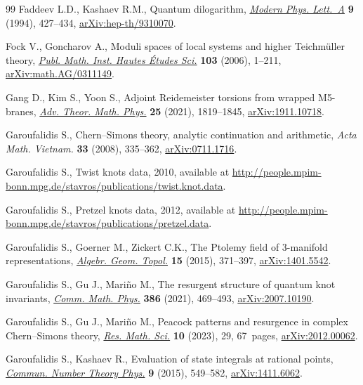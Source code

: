 \documentclass[pdftex]{sigma}
\numberwithin{equation}{section}
\begin{document}
\begin{thebibliography}{99}
Faddeev L.D., Kashaev R.M., Quantum dilogarithm, \href{https://doi.org/10.1142/S0217732394000447}{\textit{Modern Phys. Lett.~A}}
 \textbf{9} (1994), 427--434, \href{https://arxiv.org/abs/hep-th/9310070}{arXiv:hep-th/9310070}.

Fock V., Goncharov A., Moduli spaces of local systems and higher
 {T}eichm\"uller theory, \href{https://doi.org/10.1007/s10240-006-0039-4}{\textit{Publ. Math. Inst. Hautes \'Etudes Sci.}}
 \textbf{103} (2006), 1--211, \href{https://arxiv.org/abs/math.AG/0311149}{arXiv:math.AG/0311149}.

Gang D., Kim S., Yoon S., Adjoint {R}eidemeister torsions from wrapped
 {M}5-branes, \href{https://doi.org/10.4310/atmp.2021.v25.n7.a4}{\textit{Adv. Theor. Math. Phys.}} \textbf{25} (2021), 1819--1845,
 \href{https://arxiv.org/abs/1911.10718}{arXiv:1911.10718}.

Garoufalidis S., Chern--{S}imons theory, analytic continuation and arithmetic,
 \textit{Acta Math. Vietnam.} \textbf{33} (2008), 335--362,
 \href{https://arxiv.org/abs/0711.1716}{arXiv:0711.1716}.

Garoufalidis S., Twist knots data, 2010, available at
 \url{http://people.mpim-bonn.mpg.de/stavros/publications/twist.knot.data}.

Garoufalidis S., Pretzel knots data, 2012, available at
 \url{http://people.mpim-bonn.mpg.de/stavros/publications/pretzel.data}.

Garoufalidis S., Goerner M., Zickert C.K., The {P}tolemy field of 3-manifold
 representations, \href{https://doi.org/10.2140/agt.2015.15.371}{\textit{Algebr. Geom. Topol.}} \textbf{15} (2015), 371--397,
 \href{https://arxiv.org/abs/1401.5542}{arXiv:1401.5542}.

Garoufalidis S., Gu J., Mari\~no M., The resurgent structure of quantum knot
 invariants, \href{https://doi.org/10.1007/s00220-021-04076-0}{\textit{Comm. Math. Phys.}} \textbf{386} (2021), 469--493,
 \href{https://arxiv.org/abs/2007.10190}{arXiv:2007.10190}.

Garoufalidis S., Gu J., Mari\~no M., Peacock patterns and resurgence in complex
 {C}hern--{S}imons theory, \href{https://doi.org/10.1007/s40687-023-00391-1}{\textit{Res. Math. Sci.}} \textbf{10} (2023), 29,
 67~pages, \href{https://arxiv.org/abs/2012.00062}{arXiv:2012.00062}.

Garoufalidis S., Kashaev R., Evaluation of state integrals at rational points,
 \href{https://doi.org/10.4310/CNTP.2015.v9.n3.a3}{\textit{Commun. Number Theory Phys.}} \textbf{9} (2015), 549--582,
 \href{https://arxiv.org/abs/1411.6062}{arXiv:1411.6062}.


\end{thebibliography}
\end{document}
